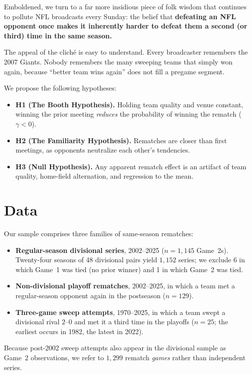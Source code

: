 \documentclass[10pt,twocolumn,letterpaper]{article}
\begin{document}
Emboldened, we turn to a far more insidious piece of folk wisdom that continues to pollute NFL broadcasts every Sunday: the belief that \textbf{defeating an NFL opponent once makes it inherently harder to defeat them a second (or third) time in the same season.}

The appeal of the clich\'{e} is easy to understand. Every broadcaster remembers the 2007 Giants. Nobody remembers the many sweeping teams that simply won again, because ``better team wins again'' does not fill a pregame segment.

We propose the following hypotheses:
\begin{itemize}[leftmargin=1.2em, itemsep=2pt]
  \item \textbf{H1 (The Booth Hypothesis).} Holding team quality and venue constant, winning the prior meeting \textit{reduces} the probability of winning the rematch ($\gamma < 0$).
  \item \textbf{H2 (The Familiarity Hypothesis).} Rematches are closer than first meetings, as opponents neutralize each other's tendencies.
  \item \textbf{H3 (Null Hypothesis).} Any apparent rematch effect is an artifact of team quality, home-field alternation, and regression to the mean.
\end{itemize}

\section{Data}
Our sample comprises three families of same-season rematches:
\begin{itemize}[leftmargin=1.2em, itemsep=2pt]
  \item \textbf{Regular-season divisional series}, 2002--2025 ($n = 1{,}145$ Game~2s). Twenty-four seasons of 48 divisional pairs yield $1{,}152$ series; we exclude 6 in which Game~1 was tied (no prior winner) and 1 in which Game~2 was tied.
  \item \textbf{Non-divisional playoff rematches}, 2002--2025, in which a team met a regular-season opponent again in the postseason ($n = 129$).
  \item \textbf{Three-game sweep attempts}, 1970--2025, in which a team swept a divisional rival $2\text{--}0$ and met it a third time in the playoffs ($n = 25$; the earliest occurs in 1982, the latest in 2022).
\end{itemize}
Because post-2002 sweep attempts also appear in the divisional sample as Game~2 observations, we refer to $1{,}299$ rematch \textit{games} rather than independent series.
\end{document}
